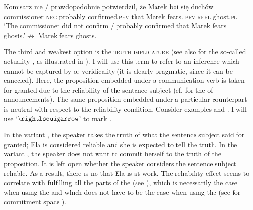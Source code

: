 \documentclass[output=paper,  modfonts,  newtxmath,  hidelinks		  ]{langscibook}
\begin{document}
\ea\label{21:5}
\gll Komisarz nie / prawdopodobnie potwierdził, że Marek boi się duchów.\\
    commissioner \textsc{neg} {} probably confirmed.\textsc{pfv} that Marek fears.\textsc{ipfv} \textsc{refl} ghost.\textsc{pl}\\
\glt	 `The commissioner did not confirm / probably confirmed that Marek fears ghosts.'\newline$\nrightarrow$ Marek fears ghosts.
\z

\noindent The third and weakest option is the \textsc{truth implicature} (see also \citealt{Hacquard2006} for the so-called actuality , as illustrated in ). I will use this term to refer to an inference which cannot be captured by  or veridicality (it is clearly pragmatic, since it can be canceled). Here, the proposition embedded under a  communication verb is taken for granted due to the reliability of the sentence subject (cf. \citealt{Schlenker2010} for the  of announcements). The same proposition embedded under a particular  counterpart is neutral with respect to the reliability condition. Consider examples  and . I will use ‘$\rightlsquigarrow$’ to mark .
 
\ea
	\z
\z


\noindent In the  variant , the speaker takes the truth of what the sentence subject said for granted; Ela is considered reliable and she is expected to tell the truth. In the  variant , the speaker does not want to commit herself to the truth of the proposition. It is left open whether the speaker considers the sentence subject reliable. As a result, there is no  that Ela is at work. The reliability effect seems to correlate with fulfilling all the parts of the  (see ), which is necessarily the case when using the  and which does not have to be the case when using the  (see \citealt{CohenKrifka2014,Krifka2015} for commitment space ).
\end{document}
